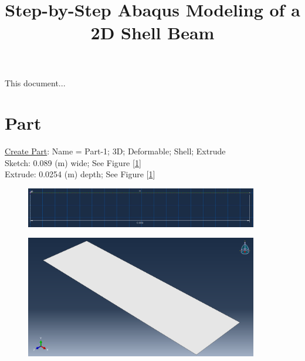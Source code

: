 \documentclass{article}
\begin{document}
	
	\title{Step-by-Step Abaqus Modeling of a 2D Shell Beam}
	\author{}
	\date{}
	\maketitle
	
	This document...
	
	\section{Part}
	\underline{Create Part}: Name  =  Part-1; 3D; Deformable; Shell; Extrude\\
	Sketch: 0.089 (m) wide; See Figure [\ref{fig:extsketch}]\\
	Extrude: 0.0254 (m) depth; See Figure [\ref{fig:extsketch}]
	\begin{figure}[H]
		\centering
		\includegraphics[width =4in]{Figures/shell_extrude_sketch.png}
		\caption{}
		\label{fig:extsketch}
	\end{figure}
	\begin{figure}[H]
		\centering
		\includegraphics[width=4in]{Figures/shell_extrude.png}
		\caption{}
		\label{fig:ext}
	\end{figure}
	
\end{document}
